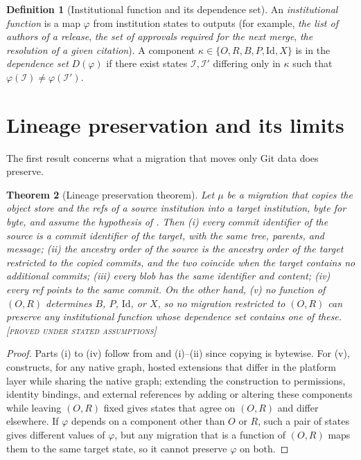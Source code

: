 \documentclass[11pt,twoside,openright]{book}
\theoremstyle{plain}
\newtheorem{theorem}{Theorem}[chapter]
\theoremstyle{definition}
\newtheorem{definition}[theorem]{Definition}
\theoremstyle{remark}
\newcommand{\Proved}{\textup{\textsc{[proved under stated assumptions]}}}
\begin{document}
\begin{definition}[Institutional function and its dependence set]\label{def:instfunc}
An \emph{institutional function} is a map $\varphi$ from institution states to outputs (for example, \emph{the list of authors of a release}, \emph{the set of approvals required for the next merge}, \emph{the resolution of a given citation}). A component $\kappa\in\{O,R,B,P,\mathrm{Id},X\}$ is in the \emph{dependence set} $D(\varphi)$ if there exist states $\mathcal{I},\mathcal{I}'$ differing only in $\kappa$ such that $\varphi(\mathcal{I})\ne\varphi(\mathcal{I}')$.
\end{definition}

\section{Lineage preservation and its limits}

The first result concerns what a migration that moves only Git data does preserve.

\begin{theorem}[Lineage preservation theorem]\label{thm:lineagepres}
Let $\mu$ be a migration that copies the object store and the refs of a source institution into a target institution, byte for byte, and assume the hypothesis of . Then (i) every commit identifier of the source is a commit identifier of the target, with the same tree, parents, and message; (ii) the ancestry order of the source is the ancestry order of the target restricted to the copied commits, and the two coincide when the target contains no additional commits; (iii) every blob has the same identifier and content; (iv) every ref points to the same commit. On the other hand, (v) no function of $(O,R)$ determines $B$, $P$, $\mathrm{Id}$, or $X$, so no migration restricted to $(O,R)$ can preserve any institutional function whose dependence set contains one of these.
\Proved{}
\end{theorem}

\begin{proof}
Parts (i) to (iv) follow from  and (i)--(ii) since copying is bytewise. For (v),  constructs, for any native graph, hosted extensions that differ in the platform layer while sharing the native graph; extending the construction to permissions, identity bindings, and external references by adding or altering these components while leaving $(O,R)$ fixed gives states that agree on $(O,R)$ and differ elsewhere. If $\varphi$ depends on a component other than $O$ or $R$, such a pair of states gives different values of $\varphi$, but any migration that is a function of $(O,R)$ maps them to the same target state, so it cannot preserve $\varphi$ on both.
\end{proof}
\end{document}
